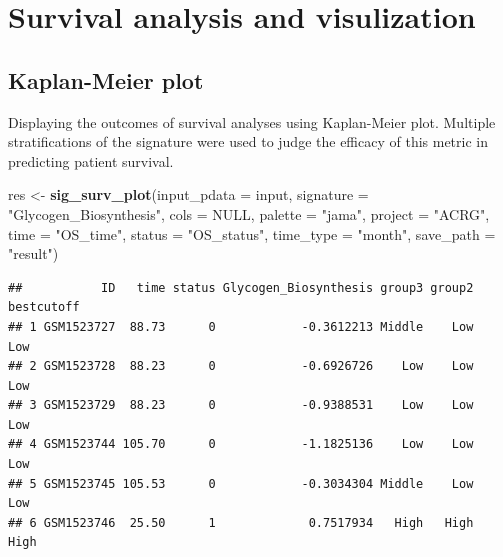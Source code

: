 \documentclass[
  12pt,
]{book}
\newenvironment{Shaded}{\begin{snugshade}}{\end{snugshade}}
\newcommand{\AttributeTok}[1]{\textcolor[rgb]{0.13,0.29,0.53}{#1}}
\newcommand{\ConstantTok}[1]{\textcolor[rgb]{0.56,0.35,0.01}{#1}}
\newcommand{\FunctionTok}[1]{\textcolor[rgb]{0.13,0.29,0.53}{\textbf{#1}}}
\newcommand{\NormalTok}[1]{#1}
\newcommand{\OtherTok}[1]{\textcolor[rgb]{0.56,0.35,0.01}{#1}}
\newcommand{\StringTok}[1]{\textcolor[rgb]{0.31,0.60,0.02}{#1}}
\begin{document}
\hypertarget{survival-analysis-and-visulization}{%
\section{Survival analysis and visulization}\label{survival-analysis-and-visulization}}

\hypertarget{kaplan-meier-plot}{%
\subsection{Kaplan-Meier plot}\label{kaplan-meier-plot}}

Displaying the outcomes of survival analyses using Kaplan-Meier plot. Multiple stratifications of the signature were used to judge the efficacy of this metric in predicting patient survival.

\begin{Shaded}
\begin{Highlighting}[]
\NormalTok{res }\OtherTok{\textless{}{-}}       \FunctionTok{sig\_surv\_plot}\NormalTok{(}\AttributeTok{input\_pdata       =}\NormalTok{ input, }
                           \AttributeTok{signature         =} \StringTok{"Glycogen\_Biosynthesis"}\NormalTok{,}
                           \AttributeTok{cols              =} \ConstantTok{NULL}\NormalTok{, }
                           \AttributeTok{palette           =} \StringTok{"jama"}\NormalTok{,}
                           \AttributeTok{project           =} \StringTok{"ACRG"}\NormalTok{,}
                           \AttributeTok{time              =} \StringTok{"OS\_time"}\NormalTok{,}
                           \AttributeTok{status            =} \StringTok{"OS\_status"}\NormalTok{,}
                           \AttributeTok{time\_type         =} \StringTok{"month"}\NormalTok{,}
                           \AttributeTok{save\_path         =} \StringTok{"result"}\NormalTok{)}
\end{Highlighting}
\end{Shaded}

\begin{verbatim}
##           ID   time status Glycogen_Biosynthesis group3 group2 bestcutoff
## 1 GSM1523727  88.73      0            -0.3612213 Middle    Low        Low
## 2 GSM1523728  88.23      0            -0.6926726    Low    Low        Low
## 3 GSM1523729  88.23      0            -0.9388531    Low    Low        Low
## 4 GSM1523744 105.70      0            -1.1825136    Low    Low        Low
## 5 GSM1523745 105.53      0            -0.3034304 Middle    Low        Low
## 6 GSM1523746  25.50      1             0.7517934   High   High       High
\end{verbatim}
\end{document}

